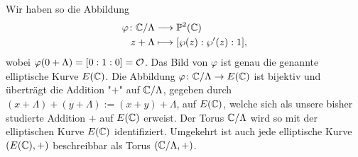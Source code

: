 Wir haben so die Abbildung
\begin{equation}
\begin{aligned}
	\varphi \colon \mathbb{C} / \Lambda &\longrightarrow \mathbb{P}^2(\mathbb{C}) \\
	z+\Lambda &\longmapsto [\wp(z) : \wp'(z) : 1],
\end{aligned}
\end{equation}
wobei $\varphi(0 + \Lambda) = [0:1:0] = \mathcal{O}$.
Das Bild von $\varphi$ ist genau die genannte elliptische Kurve $E(\mathbb{C})$.
Die Abbildung $\varphi \colon \mathbb{C}/\Lambda \rightarrow E(\mathbb{C})$ ist bijektiv und überträgt die Addition "$+$" auf $\mathbb{C}/\Lambda$, gegeben durch $(x+\Lambda) + (y+\Lambda) := (x+y) + \Lambda$, auf $E(\mathbb{C})$, welche sich als unsere bisher studierte Addition $+$ auf $E(\mathbb{C})$ erweist.
Der Torus $\mathbb{C}/\Lambda$ wird so mit der elliptischen Kurve $E(\mathbb{C})$ identifiziert.
Umgekehrt ist auch jede elliptische Kurve $(E(\mathbb{C}),+)$ beschreibbar als Torus $(\mathbb{C}/\Lambda,+)$.